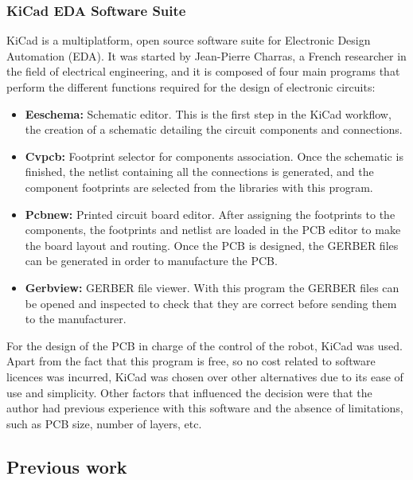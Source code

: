 \subsubsection{KiCad EDA Software Suite}

KiCad \cite{kicad:website} is a multiplatform, open source software suite for Electronic Design Automation (EDA). It was started by Jean-Pierre Charras, a French researcher in the field of electrical engineering, and it is composed of four main programs that perform the different functions required for the design of electronic circuits:\\

\begin{itemize}
	\item \textbf{Eeschema:} Schematic editor. This is the first step in the KiCad workflow, the creation of a schematic detailing the circuit components and connections. 
		\item \textbf{Cvpcb:} Footprint selector for components association. Once the schematic is finished, the netlist containing all the connections is generated, and the component footprints are selected from the libraries with this program.
	\item \textbf{Pcbnew:} Printed circuit board editor. After assigning the footprints to the components, the footprints and netlist are loaded in the PCB editor to make the board layout and routing. Once the PCB is designed, the GERBER files can be generated in order to manufacture the PCB.
	\item \textbf{Gerbview:} GERBER file viewer. With this program the GERBER files can be opened and inspected to check that they are correct before sending them to the manufacturer.

\end{itemize} 

For the design of the PCB in charge of the control of the robot, KiCad was used. Apart from the fact that this program is free, so no cost related to software licences was incurred, KiCad was chosen over other alternatives due to its ease of use and simplicity. Other factors that influenced the decision were that the author had previous experience with this software and the absence of limitations, such as PCB size, number of layers, etc.

\subsection{Previous work}
\label{hardware_electronics_previouswork}

